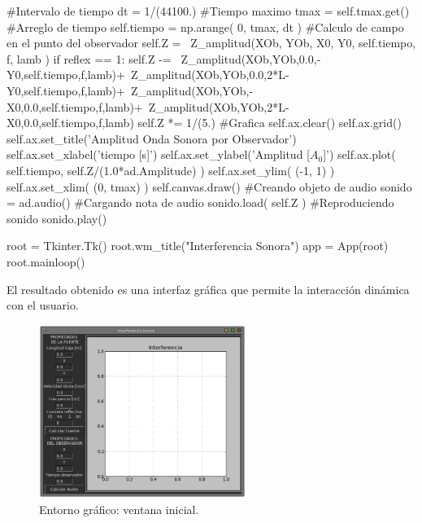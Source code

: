 \begin{listing}[style=python]
    #Intervalo de tiempo
    dt = 1/(44100.)
    #Tiempo maximo
    tmax = self.tmax.get()
    #Arreglo de tiempo
    self.tiempo = np.arange( 0, tmax, dt )
    #Calculo de campo en el punto del observador
    self.Z = \
    Z_amplitud(XOb, YOb, X0, Y0, self.tiempo, f, lamb )
    if reflex == 1:
      self.Z -= \
      Z_amplitud(XOb,YOb,0.0,-Y0,self.tiempo,f,lamb)+\
      Z_amplitud(XOb,YOb,0.0,2*L-Y0,self.tiempo,f,lamb)+\
      Z_amplitud(XOb,YOb,-X0,0.0,self.tiempo,f,lamb)+\
      Z_amplitud(XOb,YOb,2*L-X0,0.0,self.tiempo,f,lamb)
      self.Z *= 1/(5.)
    #Grafica
    self.ax.clear()
    self.ax.grid()
    self.ax.set_title('Amplitud Onda Sonora por Observador')
    self.ax.set_xlabel('tiempo [s]')
    self.ax.set_ylabel('Amplitud [$A_0$]')
    self.ax.plot( self.tiempo, self.Z/(1.0*ad.Amplitude) )
    self.ax.set_ylim( (-1, 1) )
    self.ax.set_xlim( (0, tmax) )
    self.canvas.draw()
    #Creando objeto de audio
    sonido = ad.audio()
    #Cargando nota de audio
    sonido.load( self.Z )
    #Reproduciendo sonido
    sonido.play()
        
root = Tkinter.Tk()
root.wm_title("Interferencia Sonora")
app = App(root)
root.mainloop()
\end{listing}

El resultado obtenido es una interfaz gráfica que permite la interacción 
dinámica con el usuario.


\begin{figure}[htbp]
	\centering
	\includegraphics[width=0.60\textwidth]
	{./pictures/environment_Initial.png}

	\caption{\small{Entorno gráfico: ventana inicial.}}
	
	\label{fig:env_empty}
\end{figure}

